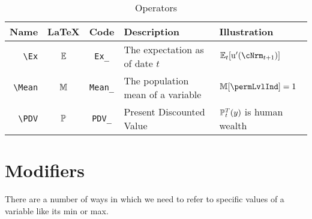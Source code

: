 \documentclass[12pt]{\econtex}
\begin{document}
\begin{table}[ht]
  \centering
  \begin{tabular}{|>{\ttfamily}rccll|} 		
    \hline
    Name    & \LaTeX         & Code & Description & Illustration
    \\ \hline
    \verb|\Ex|        & $\mathbb{E}$       & \texttt{Ex\_} & The expectation as of date $t$ & $\Ex_{t}[\uFunc^{\prime}(\cNrm_{t+1})]$
\\     \verb|\Mean| & $\mathbb{M}$ & \texttt{Mean\_} & The population mean of a variable & $\Mean[\permLvlInd]=1$
    \\   \verb|\PDV|        & $\mathbb{P}$       & \texttt{PDV\_} & Present Discounted Value & $\mathbb{P}_{t}^{T}(y)$ is human wealth
    \\	\hline
  \end{tabular}
  \caption{Operators}
  \label{table:Operators}
\end{table}	


\medskip\medskip

\hypertarget{Modifiers}{}
\section{Modifiers}

There are a number of ways in which we need to refer to specific values of a variable like its min or max.  
\end{document}
